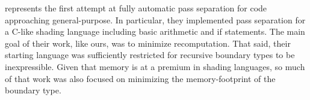 \documentclass{article}
\begin{document}
\cite{knoblock} represents the first attempt at fully automatic pass separation for code approaching general-purpose.  In particular, they implemented pass separation for a C-like shading language including basic arithmetic and if statements.  The main goal of their work, like ours, was to minimize recomputation. That said, their starting language was sufficiently restricted for recursive boundary types to be inexpressible.  Given that memory is at a premium in shading languages, so much of that work was also focused on minimizing the memory-footprint of the boundary type.



\end{document}

